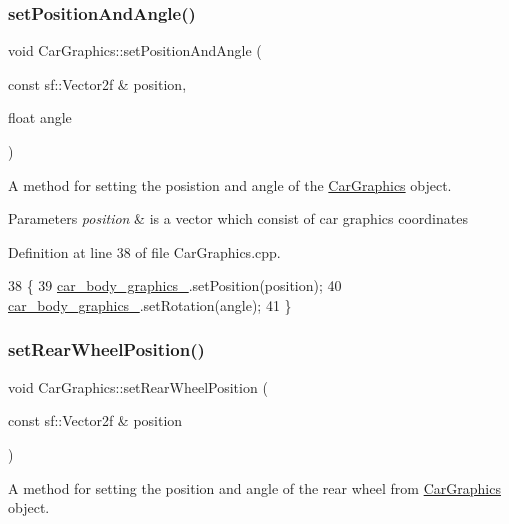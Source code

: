 \subsubsection{\texorpdfstring{set\+Position\+And\+Angle()}{setPositionAndAngle()}}
{\footnotesize\ttfamily void Car\+Graphics\+::set\+Position\+And\+Angle (\begin{DoxyParamCaption}\item[{const sf\+::\+Vector2f \&}]{position,  }\item[{float}]{angle }\end{DoxyParamCaption})}



A method for setting the posistion and angle of the \hyperlink{classCarGraphics}{Car\+Graphics} object. 


\begin{DoxyParams}{Parameters}
{\em position} & is a vector which consist of car graphic\textquotesingle{}s coordinates \\
\hline
\end{DoxyParams}


Definition at line 38 of file Car\+Graphics.\+cpp.


\begin{DoxyCode}
38                                                                              \{
39     \hyperlink{classCarGraphics_a4e1969ef5f4326f10b83b1488484f660}{car\_body\_graphics\_}.setPosition(position);
40     \hyperlink{classCarGraphics_a4e1969ef5f4326f10b83b1488484f660}{car\_body\_graphics\_}.setRotation(angle);
41 \}
\end{DoxyCode}
\mbox{\label{classCarGraphics_a30a28ce4d33808d22f6ca460c5b8013d}} 
\subsubsection{\texorpdfstring{set\+Rear\+Wheel\+Position()}{setRearWheelPosition()}}
{\footnotesize\ttfamily void Car\+Graphics\+::set\+Rear\+Wheel\+Position (\begin{DoxyParamCaption}\item[{const sf\+::\+Vector2f \&}]{position }\end{DoxyParamCaption})}



A method for setting the position and angle of the rear wheel from \hyperlink{classCarGraphics}{Car\+Graphics} object. 


